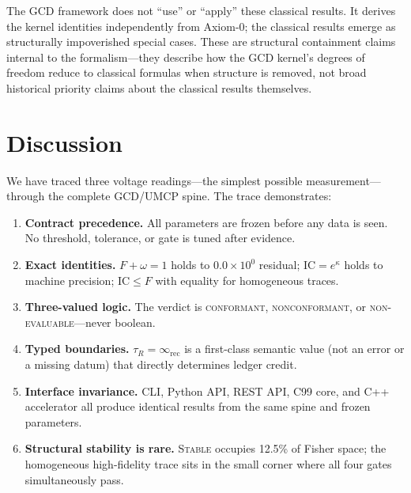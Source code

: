 \documentclass[
  aps,
  prd,
  twocolumn,
  superscriptaddress,
  nofootinbib,
  floatfix
]{revtex4-2}
\newcommand{\tR}{\tau_{\!R}}
\newcommand{\IR}{\infty_{\mathrm{rec}}}
\newcommand{\regime}[1]{\textrm{\upshape\scshape#1}}
\newcommand{\conform}{\regime{conformant}}
\newcommand{\nonconform}{\regime{nonconformant}}
\newcommand{\neval}{\regime{non-evaluable}}
\newcommand{\IC}{\mathrm{IC}}
\begin{document}
The GCD framework does not ``use'' or ``apply'' these classical
results.  It derives the kernel identities independently from
Axiom-0; the classical results emerge as structurally impoverished
special cases.  These are structural containment claims internal to
the formalism---they describe how the GCD kernel's degrees of freedom
reduce to classical formulas when structure is removed, not broad
historical priority claims about the classical results themselves.

\section{Discussion}\label{sec:discussion}

We have traced three voltage readings---the simplest possible
measurement---through the complete GCD/UMCP spine.  The trace
demonstrates:

\begin{enumerate}[leftmargin=*]
\item \textbf{Contract precedence.}  All parameters are frozen
  before any data is seen.  No threshold, tolerance, or gate is
  tuned after evidence.

\item \textbf{Exact identities.}  $F + \omega = 1$ holds to
  $0.0 \times 10^0$ residual; $\IC = e^\kappa$ holds to machine
  precision; $\IC \leq F$ with equality for homogeneous traces.

\item \textbf{Three-valued logic.}  The verdict is \conform{},
  \nonconform{}, or \neval{}---never boolean.

\item \textbf{Typed boundaries.}  $\tR = \IR$ is a first-class
  semantic value (not an error or a missing datum) that directly
  determines ledger credit.

\item \textbf{Interface invariance.}  CLI, Python API, REST API,
  C99 core, and C++ accelerator all produce identical results from
  the same spine and frozen parameters.

\item \textbf{Structural stability is rare.}
  \regime{Stable} occupies 12.5\% of Fisher space; the homogeneous
  high-fidelity trace sits in the small corner where all four gates
  simultaneously pass.
\end{enumerate}
\end{document}
